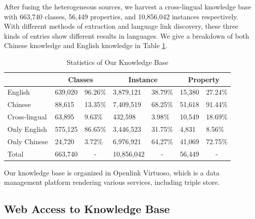 \documentclass[runningheads,a4paper]{llncs}
\begin{document}
After fusing the heterogeneous sources, we harvest a cross-lingual knowledge base with 663,740 classes, 56,449 properties, and 10,856,042 instances respectively. With different methods of extraction and language link discovery, these three kinds of entries show different results in languages. We give a breakdown of both Chinese knowledge and English knowledge in Table \ref{tab:kb-result}.
\vspace{-0.5cm}
\begin{table}[ht]
\small
\centering
\caption{Statistics of Our Knowledge Base}
\label{tab:kb-result}
\begin{tabular}{|p{2cm}|p{1.5cm}|p{1.5cm}|p{1.5cm}|p{1.5cm}|p{1.5cm}|p{1.5cm}|}
\hline
\multicolumn{1}{|c|}{} & \multicolumn{2}{c|}{Classes}     & \multicolumn{2}{c|}{Instance}                   & \multicolumn{2}{c|}{Property}    \\ \hline
English                & 639,020 & 96.26\%                & 3,879,121              & 38.79\%                & 15,380  & 27.24\%                \\ \hline
Chinese                & 88,615  & 13.35\%                & 7,409,519              & 68.25\%                & 51,618  & 91.44\%                \\ \hline
Cross-lingual          & 63,895  & 9.63\%                 & 432,598                & 3.98\%                 & 10,549  & 18.69\%                \\ \hline
Only English           & 575,125 & 86.65\%                & 3,446,523              & 31.75\%                & 4,831   & 8.56\%    \\ \hline
Only Chinese           & 24,720  & 3.72\%                 & 6,976,921              & 64,27\%                & 41,069  & 72.75\%   \\ \hline
Total                  & 663,740 & \multicolumn{1}{c|}{-} & 10,856,042             & \multicolumn{1}{c|}{-} & 56,449  & \multicolumn{1}{c|}{-} \\ \hline
\end{tabular}
\end{table}
\vspace{-0.5cm}

Our knowledge base is organized in Openlink Virtuoso, which is a data management platform rendering various services, including triple store.

\subsection{Web Access to Knowledge Base}
\end{document}
